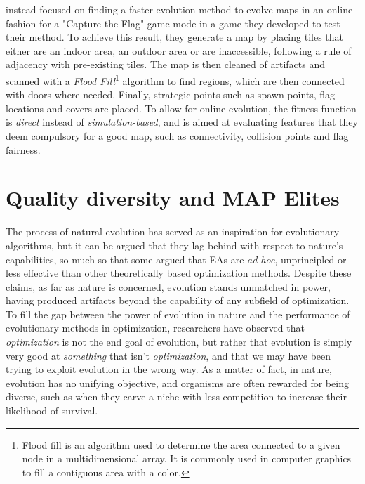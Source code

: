 \documentclass{Configuration_Files/PoliMi3i_thesis}
\begin{document}
\citeauthor{bhojan_arena_2014} instead focused on finding a faster evolution method to evolve maps in an online fashion for a "Capture the Flag" game mode in a game they developed to test their method. 
To achieve this result, they generate a map by placing tiles that either are an indoor area, an outdoor area or are inaccessible, following a rule of adjacency with pre-existing tiles. 
The map is then cleaned of artifacts and scanned with a \textit{Flood Fill}\footnote{Flood fill is an algorithm used to determine the area connected to a given node in a multidimensional array. It is commonly used in computer graphics to fill a contiguous area with a color.} algorithm to find regions, which are then connected with doors where needed. Finally, strategic points such as spawn points, flag locations and covers are placed. To allow for online evolution, the fitness function is \textit{direct} instead of \textit{simulation-based}, and is aimed at evaluating features that they deem compulsory for a good map, such as connectivity, collision points and flag fairness. \cite{bhojan_arena_2014}


\section{Quality diversity and MAP Elites}
\label{sec:qd}
The process of natural evolution has served as an inspiration for evolutionary algorithms, but it can be argued that they lag behind with respect to nature's capabilities, so much so that some argued that EAs are \textit{ad-hoc}, unprincipled or less effective than other theoretically based optimization methods. Despite these claims, as far as nature is concerned, evolution stands unmatched in power, having produced artifacts beyond the capability of any subfield of optimization. To fill the gap between the power of evolution in nature and the performance of evolutionary methods in optimization, researchers have observed that \textit{optimization} is not the end goal of evolution, but rather that evolution is simply very good at \textit{something} that isn't \textit{optimization}, and that we may have been trying to exploit evolution in the wrong way. As a matter of fact, in nature, evolution has no unifying objective, and organisms are often rewarded for being diverse, such as when they carve a niche with less competition to increase their likelihood of survival. \cite{pugh_quality_2016}
\end{document}
